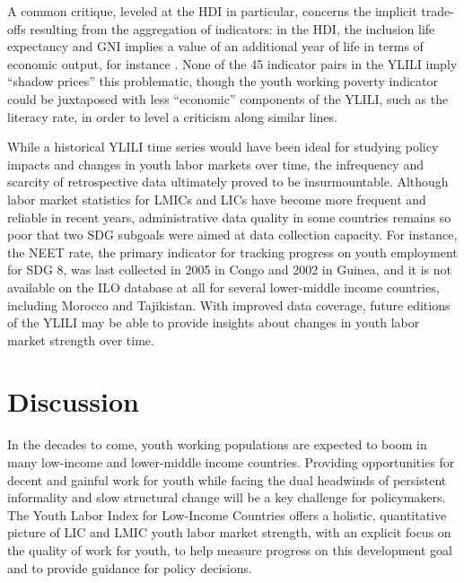 \documentclass[
  a4paper, twoside, 12pt]{book}
\begin{document}
A common critique, leveled at the HDI in particular, concerns the implicit trade-offs resulting from the aggregation of indicators: in the HDI, the inclusion life expectancy and GNI implies a value of an additional year of life in terms of economic output, for instance \autocite{ravallion2012}. None of the 45 indicator pairs in the YLILI imply ``shadow prices'' this problematic, though the youth working poverty indicator could be juxtaposed with less ``economic'' components of the YLILI, such as the literacy rate, in order to level a criticism along similar lines.

While a historical YLILI time series would have been ideal for studying policy impacts and changes in youth labor markets over time, the infrequency and scarcity of retrospective data ultimately proved to be insurmountable. Although labor market statistics for LMICs and LICs have become more frequent and reliable in recent years, administrative data quality in some countries remains so poor that two SDG subgoals were aimed at data collection capacity. For instance, the NEET rate, the primary indicator for tracking progress on youth employment for SDG 8, was last collected in 2005 in Congo and 2002 in Guinea, and it is not available on the ILO database at all for several lower-middle income countries, including Morocco and Tajikistan. With improved data coverage, future editions of the YLILI may be able to provide insights about changes in youth labor market strength over time.

\hypertarget{discussion}{%
\section{Discussion}\label{discussion}}

In the decades to come, youth working populations are expected to boom in many low-income and lower-middle income countries. Providing opportunities for decent and gainful work for youth while facing the dual headwinds of persistent informality and slow structural change will be a key challenge for policymakers. The Youth Labor Index for Low-Income Countries offers a holistic, quantitative picture of LIC and LMIC youth labor market strength, with an explicit focus on the quality of work for youth, to help measure progress on this development goal and to provide guidance for policy decisions.
\end{document}
